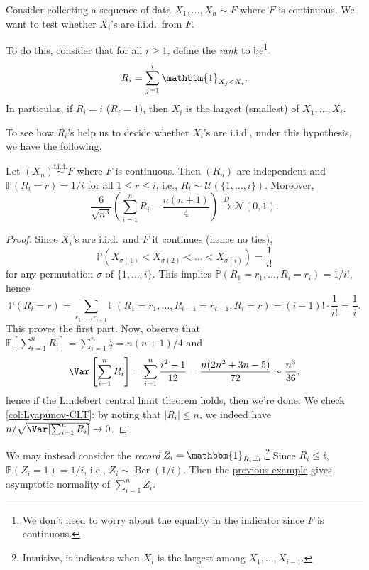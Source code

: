 \begin{problem*}
	Consider collecting a sequence of data \(X_1, \dots , X_n \sim F\) where \(F\) is continuous. We want to test whether \(X_i\)'s are i.i.d.\ from \(F\).
\end{problem*}
\begin{answer}
	To do this, consider that for all \(i \geq 1\), define the \emph{rank} to be\footnote{We don't need to worry about the equality in the indicator since \(F\) is continuous.}
	\[
		R_i = \sum_{j=1}^{i} \mathbbm{1}_{X_j < X_i}.
	\]
	In particular, if \(R_i = i\) (\(R_i = 1\)), then \(X_i\) is the largest (smallest) of \(X_1, \dots , X_i\).
\end{answer}

To see how \(R_i\)'s help us to decide whether \(X_i\)'s are i.i.d., under this hypothesis, we have the following.

\begin{theorem}\label{thm:rank}
	Let \((X_n) \overset{\text{i.i.d.} }{\sim } F\) where \(F\) is continuous. Then \((R_n)\) are independent and \(\mathbb{P} (R_i = r) = 1 / i\) for all \(1 \leq r \leq i\), i.e., \(R_i \sim \mathcal{U} (\{ 1, \dots , i \} )\). Moreover,
	\[
		\frac{6}{\sqrt{n^3} } \left( \sum_{i=1}^{n} R_i - \frac{n(n+1)}{4} \right) \overset{D}{\to} \mathcal{N} (0, 1).
	\]
\end{theorem}
\begin{proof}
	Since \(X_i\)'s are i.i.d.\ and \(F\) it continues (hence no ties),
	\[
		\mathbb{P} (X_{\sigma (1)} < X_{\sigma (2)} < \dots < X_{\sigma (i)})
		= \frac{1}{i!}
	\]
	for any permutation \(\sigma \) of \(\{ 1, \dots , i \} \). This implies \(\mathbb{P} (R_1 = r_1, \dots , R_i = r_i) = 1 / i!\), hence
	\[
		\mathbb{P} (R_i = r)
		= \sum_{r_1, \dots , r_{i-1}} \mathbb{P} (R_1 = r_1 , \dots , R_{i-1} = r_{i-1} , R_i = r)
		= (i - 1)! \cdot \frac{1}{i!}
		= \frac{1}{i}.
	\]
	This proves the first part. Now, observe that \(\mathbb{E}_{}\left[\sum_{i=1}^{n} R_i \right] = \sum_{i=1}^{n} \frac{i}{2} = n (n + 1) / 4\) and
	\[
		\Var_{}\left[\sum_{i=1}^{n} R_i \right]
		= \sum_{i=1}^{n} \frac{i^2 - 1}{12}
		= \frac{n (2 n^{2} + 3 n - 5)}{72}
		\sim \frac{n^3}{36},
	\]
	hence if the \hyperref[thm:Lindeberg-CLT]{Lindebert central limit theorem} holds, then we're done. We check \autoref{col:Lyapunov-CLT}: by noting that \(\lvert R_i \rvert \leq n\), we indeed have \(n / \sqrt{\Var_{}[\sum_{i=1}^{n} R_i]} \to 0\).
\end{proof}

\begin{remark}[Record]
	We may instead consider the \emph{record} \(Z_i = \mathbbm{1}_{R_i = i} \).\footnote{Intuitive, it indicates when \(X_i\) is the largest among \(X_1, \dots , X_{i-1}\).} Since \(R_i \leq i\), \(\mathbb{P} (Z_i = 1) = 1 / i\), i.e., \(Z_i \sim \operatorname{Ber}(1 / i) \). Then the \hyperref[eg:Lyapunov-CLT]{previous example} gives asymptotic normality of \(\sum_{i=1}^{n} Z_i\).
\end{remark}

